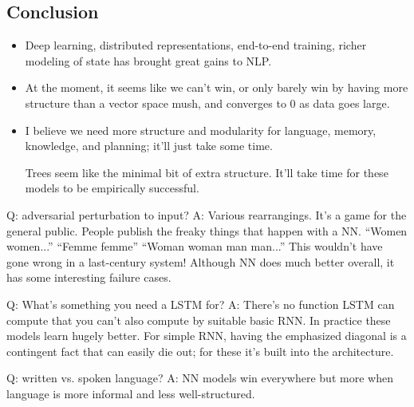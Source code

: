\subsection{Conclusion}
\begin{itemize}
\item
Deep learning, distributed representations, end-to-end training, richer modeling of state has brought great gains to NLP.
\item
At the moment, it seems like we can't win, or only barely win by having more structure than a vector space mush, and converges to 0 as data goes large.
\item
I believe we need more structure and modularity for language, memory, knowledge, and planning; it'll just take some time.

Trees seem like the minimal bit of extra structure. It'll take time for these models to be empirically successful.
\end{itemize}

Q: adversarial perturbation to input? A: Various rearrangings. It's a game for the general public. People publish the freaky things that happen with a NN.
``Women women...'' ``Femme femme'' ``Woman woman man man...'' This wouldn't have gone wrong in a last-century system! Although NN does much better overall, it has some interesting failure cases.

Q: What's something you need a LSTM for? A: There's no function LSTM can compute that you can't also compute by suitable basic RNN. In practice these models learn hugely better. For simple RNN, having the emphasized diagonal is a contingent fact that can easily die out; for these it's built into the architecture.


Q: written vs. spoken language? A: NN models win everywhere but more when language is more informal and less well-structured. 

